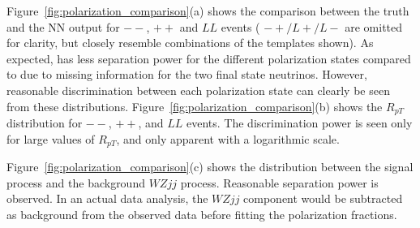  
Figure~\ref{fig:polarization_comparison}(a) shows the comparison between the truth \cts and 
the NN output \ctsNN for $--$, $++$ and $LL$ events ( $-+/L+/L-$ are omitted for clarity, but closely resemble combinations of the templates shown). As expected, \ctsNN has less separation 
power for the different polarization states compared to \cts due to missing information for the two final state neutrinos. 
However, reasonable discrimination between each polarization state can clearly be seen from these distributions. 
Figure~\ref{fig:polarization_comparison}(b) shows the $R_{pT}$ distribution for $--$, $++$, and $LL$ events. 
The discrimination power is seen only for large values of $R_{pT}$, and only apparent with a logarithmic scale.

Figure~\ref{fig:polarization_comparison}(c) shows the \ctsNN
distribution between the signal \ssWW process and the background
$WZjj$ process.  Reasonable separation power is observed. In an actual
data analysis, the $WZjj$ component would be subtracted as background
from the observed data before fitting the polarization fractions.

